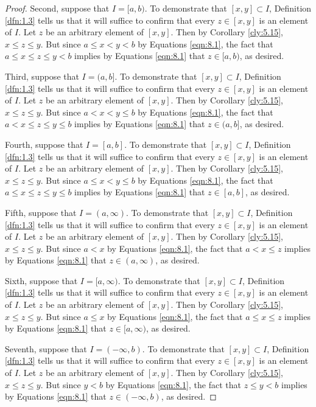 \documentclass[../main.tex]{subfiles}
\begin{document}
\begin{lemma}
\begin{proof}
        Second, suppose that $I=[a,b)$. To demonstrate that $[x,y]\subset I$, Definition \ref{dfn:1.3} tells us that it will suffice to confirm that every $z\in[x,y]$ is an element of $I$. Let $z$ be an arbitrary element of $[x,y]$. Then by Corollary \ref{cly:5.15}, $x\leq z\leq y$. But since $a\leq x<y<b$ by Equations \ref{eqn:8.1}, the fact that $a\leq x\leq z\leq y<b$ implies by Equations \ref{eqn:8.1} that $z\in[a,b)$, as desired.\par
        Third, suppose that $I=(a,b]$. To demonstrate that $[x,y]\subset I$, Definition \ref{dfn:1.3} tells us that it will suffice to confirm that every $z\in[x,y]$ is an element of $I$. Let $z$ be an arbitrary element of $[x,y]$. Then by Corollary \ref{cly:5.15}, $x\leq z\leq y$. But since $a<x<y\leq b$ by Equations \ref{eqn:8.1}, the fact that $a<x\leq z\leq y\leq b$ implies by Equations \ref{eqn:8.1} that $z\in(a,b]$, as desired.\par
        Fourth, suppose that $I=[a,b]$. To demonstrate that $[x,y]\subset I$, Definition \ref{dfn:1.3} tells us that it will suffice to confirm that every $z\in[x,y]$ is an element of $I$. Let $z$ be an arbitrary element of $[x,y]$. Then by Corollary \ref{cly:5.15}, $x\leq z\leq y$. But since $a\leq x<y\leq b$ by Equations \ref{eqn:8.1}, the fact that $a\leq x\leq z\leq y\leq b$ implies by Equations \ref{eqn:8.1} that $z\in[a,b]$, as desired.\par
        Fifth, suppose that $I=(a,\infty)$. To demonstrate that $[x,y]\subset I$, Definition \ref{dfn:1.3} tells us that it will suffice to confirm that every $z\in[x,y]$ is an element of $I$. Let $z$ be an arbitrary element of $[x,y]$. Then by Corollary \ref{cly:5.15}, $x\leq z\leq y$. But since $a<x$ by Equations \ref{eqn:8.1}, the fact that $a<x\leq z$ implies by Equations \ref{eqn:8.1} that $z\in(a,\infty)$, as desired.\par
        Sixth, suppose that $I=[a,\infty)$. To demonstrate that $[x,y]\subset I$, Definition \ref{dfn:1.3} tells us that it will suffice to confirm that every $z\in[x,y]$ is an element of $I$. Let $z$ be an arbitrary element of $[x,y]$. Then by Corollary \ref{cly:5.15}, $x\leq z\leq y$. But since $a\leq x$ by Equations \ref{eqn:8.1}, the fact that $a\leq x\leq z$ implies by Equations \ref{eqn:8.1} that $z\in[a,\infty)$, as desired.\par
        Seventh, suppose that $I=(-\infty,b)$. To demonstrate that $[x,y]\subset I$, Definition \ref{dfn:1.3} tells us that it will suffice to confirm that every $z\in[x,y]$ is an element of $I$. Let $z$ be an arbitrary element of $[x,y]$. Then by Corollary \ref{cly:5.15}, $x\leq z\leq y$. But since $y<b$ by Equations \ref{eqn:8.1}, the fact that $z\leq y<b$ implies by Equations \ref{eqn:8.1} that $z\in(-\infty,b)$, as desired.\par

\end{proof}
\end{lemma}
\end{document}
